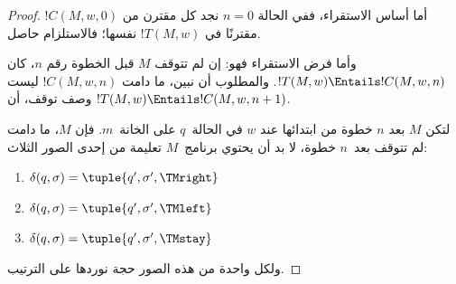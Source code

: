 \documentclass[../../../include/open-logic-section]{subfiles}
\begin{document}
\begin{proof}
أما أساس الاستقراء، ففي الحالة $n=0$ نجد كل مقترن من
$!C(M,w,0)$ مقترنًا في $!T(M,w)$ نفسها؛ فالاستلزام حاصل.

وأما فرض الاستقراء فهو: إن لم تتوقف $M$ قبل الخطوة رقم $n$،
كان $!T(M,w)\Entails !C(M,w,n)$. والمطلوب أن نبين، ما دامت
$!C(M,w,n)$ ليست وصف توقف، أن $!T(M,w)\Entails !C(M,w,n+1)$.

لتكن $M$ بعد $n$ خطوة من ابتدائها عند $w$ في الحالة~$q$
على الخانة~$m$. فإن $M$، ما دامت لم تتوقف بعد~$n$ خطوة،
لا بد أن يحتوي برنامج~$M$ تعليمة من إحدى الصور الثلاث:

\begin{enumerate}
\item {} $\delta(q, \sigma) = \tuple{q', \sigma', \TMright}$

\item {} $\delta(q, \sigma) = \tuple{q', \sigma', \TMleft}$

\item {} $\delta(q, \sigma) = \tuple{q', \sigma', \TMstay}$
\end{enumerate}

ولكل واحدة من هذه الصور حجة نوردها على الترتيب.


\end{proof}
\end{document}
